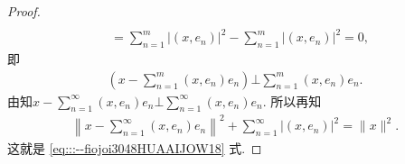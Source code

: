 \documentclass[../../main.tex]{subfiles}%
\begin{document}
\begin{proof}
\begin{align*}
\\
&=\sum_{n=1}^m{\left| \left( x,e_n \right) \right|^2}-\sum_{n=1}^m{\left| \left( x,e_n \right) \right|^2}=0,
\end{align*}
即
\begin{align*}
\left( x-\sum_{n=1}^m{(x,e_n)e_n} \right) \bot \sum_{n=1}^m{(x,e_n)e_n}.
\end{align*}
由知$x-\sum_{n=1}^{\infty}{(x,e_n)e_n}\bot \sum_{n=1}^{\infty}{(x,e_n)e_n}$.
所以再知
\begin{align*}
\left\|x-\sum\limits_{n=1}^\infty(x,e_n)e_n\right\|^2+\sum\limits_{n=1}^\infty|(x,e_n)|^2=\|x\|^2.
\end{align*}
这就是 \eqref{eq:::--fiojoi3048HUAAIJOW18} 式.

\end{proof}
\end{document}
